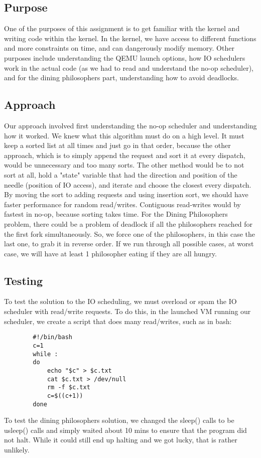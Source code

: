 \documentclass[letterpaper,10pt]{article}
\begin{document}
	\subsection{Purpose}
	One of the purposes of this assignment is to get familiar with the kernel and writing code within the kernel. In the kernel, we have access to different functions and more constraints on time, and can dangerously modify memory. Other purposes include understanding the QEMU launch options, how IO schedulers work in the actual code (as we had to read and understand the no-op scheduler), and for the dining philosophers part, understanding how to avoid deadlocks.
	
	\subsection{Approach}
	Our approach involved first understanding the no-op scheduler and understanding how it worked. We knew what this algorithm must do on a high level. It must keep a sorted list at all times and just go in that order, because the other approach, which is to simply append the request and sort it at every dispatch, would be unnecessary and too many sorts. The other method would be to not sort at all, hold a "state" variable that had the direction and position of the needle (position of IO access), and iterate and choose the closest every dispatch. By moving the sort to adding requests and using insertion sort, we should have faster performance for random read/writes. Contiguous read-writes would by fastest in no-op, because sorting takes time.
	For the Dining Philosophers problem, there could be a problem of deadlock if all the philosophers reached for the first fork simultaneously. So, we force one of the philosophers, in this case the last one, to grab it in reverse order. If we run through all possible cases, at worst case, we will have at least 1 philosopher eating if they are all hungry.
	
	\subsection{Testing}
	To test the solution to the IO scheduling, we must overload or spam the IO scheduler with read/write requests. To do this, in the launched VM running our scheduler, we create a script that does many read/writes, such as in bash:
	\begin{verbatim}
		#!/bin/bash
		c=1
		while : 
		do
			echo "$c" > $c.txt
			cat $c.txt > /dev/null
			rm -f $c.txt
			c=$((c+1))
		done
	\end{verbatim}
	To test the dining philosophers solution, we changed the sleep() calls to be usleep() calls and simply waited about 10 mins to ensure that the program did not halt. While it could still end up halting and we got lucky, that is rather unlikely.
	
\end{document}
